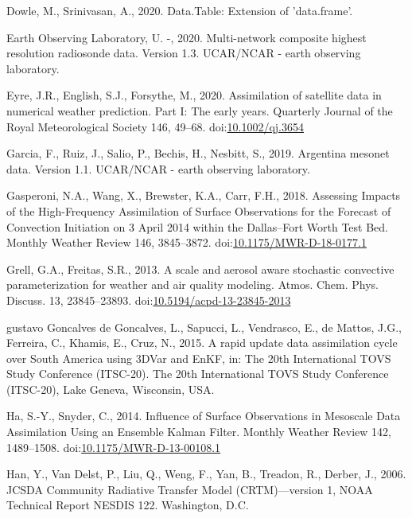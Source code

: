 \documentclass[final,5p,times,twocolumn,authoryear]{elsarticle} %
\begin{document}
\leavevmode\hypertarget{ref-dowle2020}{}%
Dowle, M., Srinivasan, A., 2020. Data.Table: Extension of 'data.frame'.

\leavevmode\hypertarget{ref-sondeos}{}%
Earth Observing Laboratory, U. -, 2020. Multi-network composite highest resolution radiosonde data. Version 1.3. UCAR/NCAR - earth observing laboratory.

\leavevmode\hypertarget{ref-eyre2020}{}%
Eyre, J.R., English, S.J., Forsythe, M., 2020. Assimilation of satellite data in numerical weather prediction. Part I: The early years. Quarterly Journal of the Royal Meteorological Society 146, 49--68. doi:\href{https://doi.org/10.1002/qj.3654}{10.1002/qj.3654}

\leavevmode\hypertarget{ref-garcia2019}{}%
Garcia, F., Ruiz, J., Salio, P., Bechis, H., Nesbitt, S., 2019. Argentina mesonet data. Version 1.1. UCAR/NCAR - earth observing laboratory.

\leavevmode\hypertarget{ref-gasperoni2018}{}%
Gasperoni, N.A., Wang, X., Brewster, K.A., Carr, F.H., 2018. Assessing Impacts of the High-Frequency Assimilation of Surface Observations for the Forecast of Convection Initiation on 3 April 2014 within the Dallas--Fort Worth Test Bed. Monthly Weather Review 146, 3845--3872. doi:\href{https://doi.org/10.1175/MWR-D-18-0177.1}{10.1175/MWR-D-18-0177.1}

\leavevmode\hypertarget{ref-grell2013}{}%
Grell, G.A., Freitas, S.R., 2013. A scale and aerosol aware stochastic convective parameterization for weather and air quality modeling. Atmos. Chem. Phys. Discuss. 13, 23845--23893. doi:\href{https://doi.org/10.5194/acpd-13-23845-2013}{10.5194/acpd-13-23845-2013}

\leavevmode\hypertarget{ref-goncalvesdegoncalves2015}{}%
gustavo Goncalves de Goncalves, L., Sapucci, L., Vendrasco, E., de Mattos, J.G., Ferreira, C., Khamis, E., Cruz, N., 2015. A rapid update data assimilation cycle over South America using 3DVar and EnKF, in: The 20th International TOVS Study Conference (ITSC-20). The 20th International TOVS Study Conference (ITSC-20), Lake Geneva, Wisconsin, USA.

\leavevmode\hypertarget{ref-ha2014}{}%
Ha, S.-Y., Snyder, C., 2014. Influence of Surface Observations in Mesoscale Data Assimilation Using an Ensemble Kalman Filter. Monthly Weather Review 142, 1489--1508. doi:\href{https://doi.org/10.1175/MWR-D-13-00108.1}{10.1175/MWR-D-13-00108.1}

\leavevmode\hypertarget{ref-han2006}{}%
Han, Y., Van Delst, P., Liu, Q., Weng, F., Yan, B., Treadon, R., Derber, J., 2006. JCSDA Community Radiative Transfer Model (CRTM)---version 1, NOAA Technical Report NESDIS 122. Washington, D.C.
\end{document}
